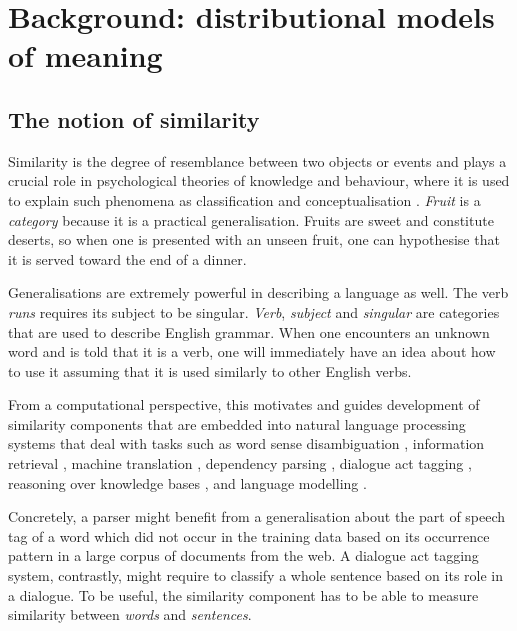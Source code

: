\chapter{Background: distributional models of meaning}
\label{cha:background}

\section{The notion of similarity}
\label{sec:similarity}

Similarity is the degree of resemblance between two objects or events \cite{WCS:WCS1282} and plays a crucial role in psychological theories of knowledge and behaviour, where it is used to explain such phenomena as classification and conceptualisation \cite{Tversky1977,1986-13502-00119860101,medin1993respects,Markman1996,hahn1997concepts}. \textit{Fruit} is a \emph{category} because it is a practical generalisation. Fruits are sweet and constitute deserts, so when one is presented with an unseen fruit, one can hypothesise that it is served toward the end of a dinner.

Generalisations are extremely powerful in describing a language as well. The verb \textit{runs} requires its subject to be singular. \textit{Verb}, \textit{subject} and \textit{singular} are categories that are used to describe English grammar. When one encounters an unknown word and is told that it is a verb, one will immediately have an idea about how to use it assuming that it is used similarly to other English verbs.

From a computational perspective, this motivates and guides development of similarity components that are embedded into natural language processing systems that deal with tasks such as
word sense disambiguation \cite{Schutze:1998:AWS:972719.972724},
information retrieval \cite{Salton:1975:VSM:361219.361220,Milajevs:2015:IMN:2808194.2809448},
machine translation \cite{Dagan:1993:CWS:981574.981596},
dependency parsing \cite{hermann-blunsom:2013:ACL2013,andreas-klein:2014:P14-2},
dialogue act tagging \cite{kalchbrenner-blunsom:2013:CVSC,milajevs-purver:2014:CVSC},
reasoning over knowledge bases \cite{NIPS2013_5028},
and language modelling \cite{bengio2006}.

Concretely, a parser might benefit from a generalisation about the part of speech tag of a word which did not occur in the training data based on its occurrence pattern in a large corpus of documents from the web. A dialogue act tagging system, contrastly, might require to classify a whole sentence based on its role in a dialogue. To be useful, the similarity component has to be able to measure similarity between \emph{words} and \emph{sentences}.

